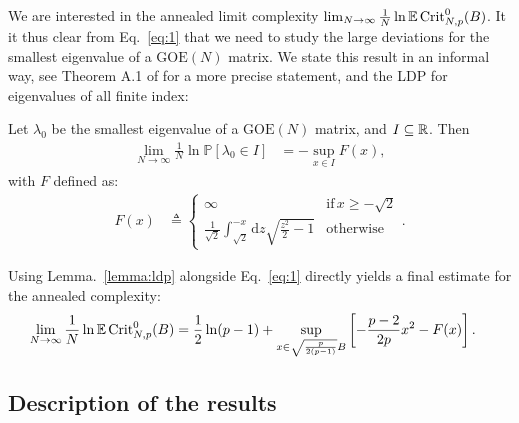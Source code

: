 \documentclass[amsmath,amssymb,nofootinbib,prd]{article}
\begin{document}
		
	We are interested in the annealed limit complexity	$\lim_{N \to \infty} \frac{1}{N} \ln \mathbb{E} \, \mathrm{Crit}_{N,p}^0(B)$. It it thus clear from Eq.~\ref{eq:1} that we need to study the large deviations for the smallest eigenvalue of a $\mathrm{GOE}(N)$ matrix. We state this result in an informal way, see Theorem A.1 of \cite{auffinger2013random} for a more precise statement, and the LDP for eigenvalues of all finite index:
\begin{lemma}[Informal]\label{lemma:ldp}
Let $\lambda_0$ be the smallest eigenvalue of a $\mathrm{GOE}(N)$ matrix, and $I \subseteq \mathbb{R}$. Then
\begin{align}
\lim_{N \to \infty} \frac{1}{N} \ln \mathbb{P}\left[\lambda_0 \in I\right] &= - \sup_{x \in I} F(x),
\end{align}
with $F$ defined as:
\begin{align}
F(x) &\triangleq \begin{cases} \infty &\mathrm{if}\,x \geq -\sqrt{2}  \\
 \frac{1}{\sqrt{2}} \int_{\sqrt{2}}^{-x} \mathrm{d}z\sqrt{\frac{z^2}{2} -1} & \mathrm{otherwise}
\end{cases}.
\end{align}
\end{lemma}
Using Lemma.~\ref{lemma:ldp} alongside Eq.~\ref{eq:1} directly yields a final estimate for the annealed complexity:
\begin{align}\label{eq:2}
\lim_{N \to \infty} \frac{1}{N} \ln \mathbb{E} \, \mathrm{Crit}_{N,p}^0(B) &= \frac{1}{2} \ln (p-1) + \sup_{x \in \sqrt{\frac{p}{2(p-1)}} B} \left[-\frac{p-2}{2p}x^2 - F(x)\right].
\end{align}
	
	\subsection{Description of the results}\label{subsec:summary}
	
\end{document}
